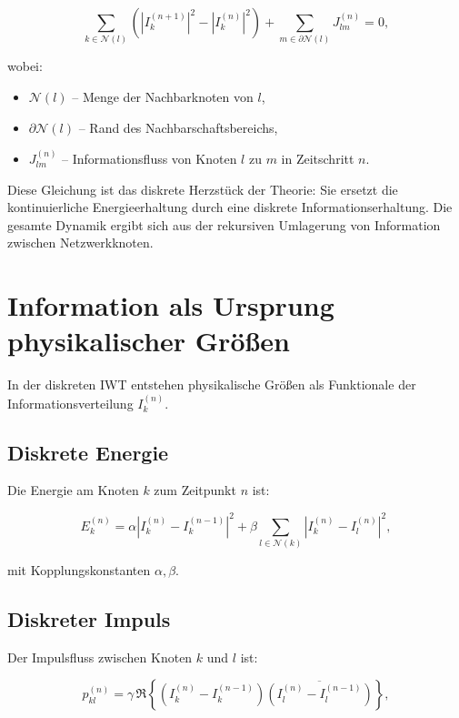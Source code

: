 \[
\sum_{k \in \mathcal{N}(l)} \left( |I_k^{(n+1)}|^2 - |I_k^{(n)}|^2 \right) + \sum_{m \in \partial \mathcal{N}(l)} J_{lm}^{(n)} = 0,
\]

wobei:

\begin{itemize}
    \item \( \mathcal{N}(l) \) – Menge der Nachbarknoten von \( l \),
    \item \( \partial \mathcal{N}(l) \) – Rand des Nachbarschaftsbereichs,
    \item \( J_{lm}^{(n)} \) – Informationsfluss von Knoten \( l \) zu \( m \) in Zeitschritt \( n \).
\end{itemize}

Diese Gleichung ist das diskrete Herzstück der Theorie: Sie ersetzt die kontinuierliche Energieerhaltung durch eine diskrete Informationserhaltung. Die gesamte Dynamik ergibt sich aus der rekursiven Umlagerung von Information zwischen Netzwerkknoten.

\section{Information als Ursprung physikalischer Größen}
\label{sec:information_als_ursprung}

In der diskreten IWT entstehen physikalische Größen als Funktionale der Informationsverteilung \( I_k^{(n)} \).

\subsection{Diskrete Energie}
\label{sub:diskrete_energie}

Die Energie am Knoten \( k \) zum Zeitpunkt \( n \) ist:

\[
E_k^{(n)} = \alpha \left| I_k^{(n)} - I_k^{(n-1)} \right|^2 + \beta \sum_{l \in \mathcal{N}(k)} \left| I_k^{(n)} - I_l^{(n)} \right|^2,
\]

mit Kopplungskonstanten \( \alpha, \beta \).

\subsection{Diskreter Impuls}
\label{sub:diskreter_impuls}

Der Impulsfluss zwischen Knoten \( k \) und \( l \) ist:

\[
p_{kl}^{(n)} = \gamma \, \Re\left\{ \left( I_k^{(n)} - I_k^{(n-1)} \right) \overline{\left( I_l^{(n)} - I_l^{(n-1)} \right)} \right\},
\]

